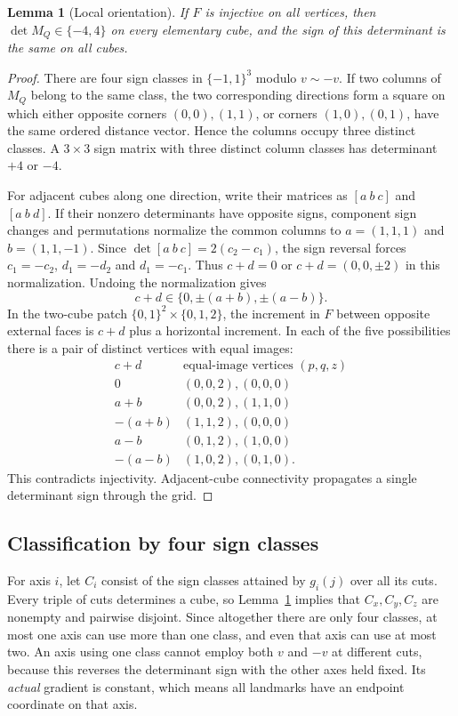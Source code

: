 \documentclass[10pt,a4paper]{article}
\newtheorem{lemma}{Lemma}
\begin{document}
\begin{lemma}[Local orientation]\label{lem:orient}
If $F$ is injective on all vertices, then $\det M_Q\in\{-4,4\}$ on every elementary cube, and the sign of this determinant is the same on all cubes.
\end{lemma}
\begin{proof}
There are four sign classes in $\{-1,1\}^{3}$ modulo $v\sim-v$. If two columns of $M_Q$ belong to the same class, the two corresponding directions form a square on which either opposite corners $(0,0),(1,1)$, or corners $(1,0),(0,1)$, have the same ordered distance vector. Hence the columns occupy three distinct classes. A $3\times3$ sign matrix with three distinct column classes has determinant $+4$ or $-4$.

For adjacent cubes along one direction, write their matrices as $[a\ b\ c]$ and $[a\ b\ d]$. If their nonzero determinants have opposite signs, component sign changes and permutations normalize the common columns to $a=(1,1,1)$ and $b=(1,1,-1)$. Since $\det[a\ b\ c]=2(c_2-c_1)$, the sign reversal forces $c_1=-c_2$, $d_1=-d_2$ and $d_1=-c_1$. Thus $c+d=0$ or $c+d=(0,0,\pm2)$ in this normalization. Undoing the normalization gives
\[c+d\in\{0,\pm(a+b),\pm(a-b)\}.\]
In the two-cube patch $\{0,1\}^2\times\{0,1,2\}$, the increment in $F$ between opposite external faces is $c+d$ plus a horizontal increment. In each of the five possibilities there is a pair of distinct vertices with equal images:
\[
\begin{array}{c|c}
 c+d & \text{equal-image vertices }(p,q,z)\\\hline
0 &(0,0,2),(0,0,0)\\
a+b&(0,0,2),(1,1,0)\\
-(a+b)&(1,1,2),(0,0,0)\\
a-b&(0,1,2),(1,0,0)\\
-(a-b)&(1,0,2),(0,1,0).
\end{array}
\]
This contradicts injectivity. Adjacent-cube connectivity propagates a single determinant sign through the grid.
\end{proof}

\subsection{Classification by four sign classes}
For axis $i$, let $C_i$ consist of the sign classes attained by $g_i(j)$ over all its cuts. Every triple of cuts determines a cube, so Lemma~\ref{lem:orient} implies that $C_x,C_y,C_z$ are nonempty and pairwise disjoint. Since altogether there are only four classes, at most one axis can use more than one class, and even that axis can use at most two. An axis using one class cannot employ both $v$ and $-v$ at different cuts, because this reverses the determinant sign with the other axes held fixed. Its \emph{actual} gradient is constant, which means all landmarks have an endpoint coordinate on that axis.
\end{document}
